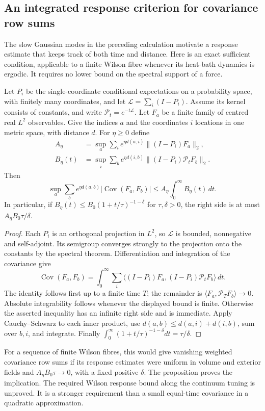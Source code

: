 \subsection{An integrated response criterion for covariance row sums}
\label{ssec:integrated-response}

The slow Gaussian modes in the preceding calculation motivate
a response estimate that keeps track of both time and distance.
Here is an exact sufficient condition, applicable to a finite
Wilson fibre whenever its heat-bath dynamics is ergodic.
It requires no lower bound on the spectral support of a force.

\begin{proposition}\label{prop:integrated-response}
Let \(P_i\) be the single-coordinate conditional expectations
on a probability space, with finitely many coordinates, and
let \(\mathscr L=\sum_i(I-P_i)\).
Assume its kernel consists of constants, and write
\(\mathscr P_t=e^{-t\mathscr L}\).
Let \(F_a\) be a finite family of centred real \(L^2\)
observables. Give the indices \(a\) and the coordinates \(i\)
locations in one metric space, with distance \(d\).
For \(\eta\ge0\) define
\[
 \begin{split}
 A_\eta&=\sup_a\sum_i e^{\eta d(a,i)}
                 \|(I-P_i)F_a\|_2,\\
 B_\eta(t)&=\sup_i\sum_b e^{\eta d(i,b)}
                 \|(I-P_i)\mathscr P_tF_b\|_2.
 \end{split}
\]
Then
\[
 \sup_a\sum_b e^{\eta d(a,b)}
           |\operatorname{Cov}(F_a,F_b)|
 \le A_\eta\int_0^\infty B_\eta(t)\,dt .
\]
In particular, if
\(B_\eta(t)\le B_0(1+t/\tau)^{-1-\delta}\)
for \(\tau,\delta>0\), the right side is at most
\(A_\eta B_0\tau/\delta\).
\end{proposition}

\begin{proof}
Each \(P_i\) is an orthogonal projection in \(L^2\), so
\(\mathscr L\) is bounded, nonnegative and self-adjoint.
Its semigroup converges strongly to the projection onto
the constants by the spectral theorem. Differentiation and
integration of the covariance give
\[
 \operatorname{Cov}(F_a,F_b)
 =\int_0^\infty
       \sum_i\langle (I-P_i)F_a,
                    (I-P_i)\mathscr P_tF_b\rangle\,dt .
\]
The identity follows first up to a finite time \(T\);
the remainder is
\(\langle F_a,\mathscr P_TF_b\rangle\to0\).
Absolute integrability follows whenever the displayed bound
is finite. Otherwise the asserted inequality has an infinite
right side and is immediate. Apply Cauchy--Schwarz to each
inner product, use
\(d(a,b)\le d(a,i)+d(i,b)\), sum over \(b,i\), and integrate.
Finally \(\int_0^\infty(1+t/\tau)^{-1-\delta}dt=\tau/\delta\).
\end{proof}

For a sequence of finite Wilson fibres, this would give
vanishing weighted covariance row sums if its response
estimates were uniform in volume and exterior fields and
\(A_\eta B_0\tau\to0\), with a fixed positive \(\delta\).
The proposition proves the implication. The required
Wilson response bound along the continuum tuning is
unproved. It is a stronger requirement than a small
equal-time covariance in a quadratic approximation.
